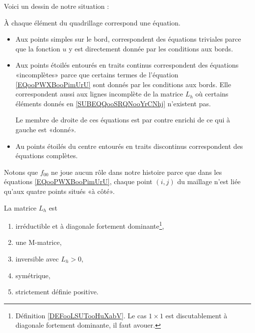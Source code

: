 Voici un dessin de notre situation :

\begin{center}
   
\end{center}

À chaque élément du quadrillage correspond une équation. 
\begin{itemize}
    \item 
        Aux points simples sur le bord, correspondent des équations triviales parce que la fonction \(u \) y est directement donnée par les conditions aux bords.
    \item
        Aux points étoilés entourés en traits continus correspondent des équations «incomplètes» parce que certains termes de l'équation \eqref{EQooPWXBooPimUrU} sont donnés par les conditions aux bords. Elle correspondent aussi aux lignes incomplète de la matrice \( L_h\) où certains éléments donnés en \eqref{SUBEQQooSRQNooYrCNhj} n'existent pas.

        Le membre de droite de ces équations est par contre enrichi de ce qui à gauche est «donné».

    \item
        Au points étoilés du centre entourés en traits discontinus correspondent des équations complètes.

\end{itemize}

Notons que \( f_{00}\) ne joue aucun rôle dans notre histoire parce que dans les équations \eqref{EQooPWXBooPimUrU}, chaque point \( (i,j)\) du maillage n'est liée qu'aux quatre points situés «à côté».


\begin{proposition} \label{PROPooWGTRooVjWhYY}
    La matrice \(L_h\) est 
    \begin{enumerate}
        \item
            irréductible et à diagonale fortement dominante\footnote{Définition \ref{DEFooLSUTooHuXabV}. Le cas \( 1\times 1\) est discutablement à diagonale fortement dominante, il faut avouer.},
        \item       \label{ITEMooOOHPooDsvUPP}
            une M-matrice,
        \item
            inversible avec \( L_{h}>0\),
        \item
            symétrique,
        \item
            strictement définie positive.
    \end{enumerate}
\end{proposition}

